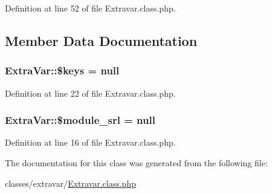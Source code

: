 Definition at line 52 of file Extravar.\+class.\+php.



\subsection{Member Data Documentation}
\subsubsection[{\texorpdfstring{\$keys}{$keys}}]{\setlength{\rightskip}{0pt plus 5cm}Extra\+Var\+::\$keys = {\bf null}}\hypertarget{classExtraVar_ac2aee2ca8a3299c952ba8f155eaadc64}{}\label{classExtraVar_ac2aee2ca8a3299c952ba8f155eaadc64}


Definition at line 22 of file Extravar.\+class.\+php.

\subsubsection[{\texorpdfstring{\$module\+\_\+srl}{$module_srl}}]{\setlength{\rightskip}{0pt plus 5cm}Extra\+Var\+::\$module\+\_\+srl = {\bf null}}\hypertarget{classExtraVar_a3a84e48f2cdf01660b2844244f8fd9f7}{}\label{classExtraVar_a3a84e48f2cdf01660b2844244f8fd9f7}


Definition at line 16 of file Extravar.\+class.\+php.



The documentation for this class was generated from the following file\+:\begin{DoxyCompactItemize}
\item 
classes/extravar/\hyperlink{Extravar_8class_8php}{Extravar.\+class.\+php}\end{DoxyCompactItemize}
